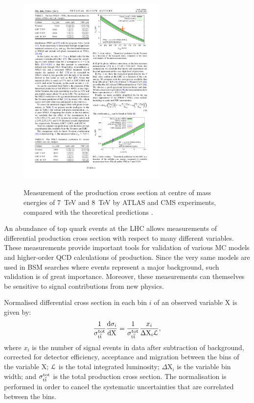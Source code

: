 \begin{figure}[bhtp]
   \centering
   {\includegraphics[width=0.65\textwidth]{xsections_comparison_NNLO}}
   \caption[Measurement of the \ttbar production cross section]{Measurement of the \ttbar production cross section at
   centre of mass energies of \SI{7}{\TeV} and \SI{8}{\TeV} by ATLAS and CMS experiments, compared with the theoretical
   predictions \autocite{NNLO_ttbar}.}
   \label{fig:xsections_comparison_NNLO}
\end{figure}

An abundance of top quark events at the LHC allows measurements of differential \ttbar production cross section with
respect to many different variables. These measurements provide important tools for validation of various MC models and
higher-order QCD calculations of \ttbar production. Since the very same models are used in BSM searches where \ttbar
events represent a major background, such validation is of great importance. Moreover, these measurements can themselves
be sensitive to signal contributions from new physics.

Normalised differential cross section in each bin $i$ of an observed variable $\mathrm{X}$ is given by:
\begin{equation}
\label{eq:normalised_differential_xsection_theory}
\frac{1}{\sigma_{\mathrm{t}\overline{\mathrm{t}}}^\mathrm{tot}} \frac{\mathrm{d}\sigma_i}{\mathrm{d} \mathrm{X}} = \frac{1}{\sigma_{\mathrm{t}\overline{\mathrm{t}}}^\mathrm{tot}}
\frac{x_i}{\Delta \mathrm{X}_i \mathcal{L}},
\end{equation}
where $x_i$ is the number of signal events in data after subtraction of background, corrected for detector efficiency,
acceptance and migration between the bins of the variable $\mathrm{X}$; $\mathcal{L}$ is the total integrated luminosity;
$\Delta \mathrm{X}_i$ is the variable bin width; and $\sigma_{\mathrm{t}\overline{\mathrm{t}}}^\mathrm{tot}$ is the total \ttbar production cross
section. The normalisation is performed in order to cancel the systematic uncertainties that are correlated between the
bins.

